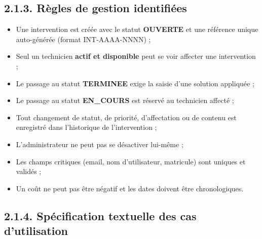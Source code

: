 \documentclass[11pt,a4paper]{report}
\begin{document}
\subsection*{2.1.3. Règles de gestion identifiées}
\begin{itemize}
  \item Une intervention est créée avec le statut \textbf{OUVERTE} et une référence unique auto-générée (format INT-AAAA-NNNN) ;
  \item Seul un technicien \textbf{actif et disponible} peut se voir affecter une intervention ;
  \item Le passage au statut \textbf{TERMINEE} exige la saisie d'une solution appliquée ;
  \item Le passage au statut \textbf{EN\_COURS} est réservé au technicien affecté ;
  \item Tout changement de statut, de priorité, d'affectation ou de contenu est enregistré dans l'historique de l'intervention ;
  \item L'administrateur ne peut pas se désactiver lui-même ;
  \item Les champs critiques (email, nom d'utilisateur, matricule) sont uniques et validés ;
  \item Un coût ne peut pas être négatif et les dates doivent être chronologiques.
\end{itemize}
\subsection*{2.1.4. Spécification textuelle des cas d'utilisation}
\end{document}
